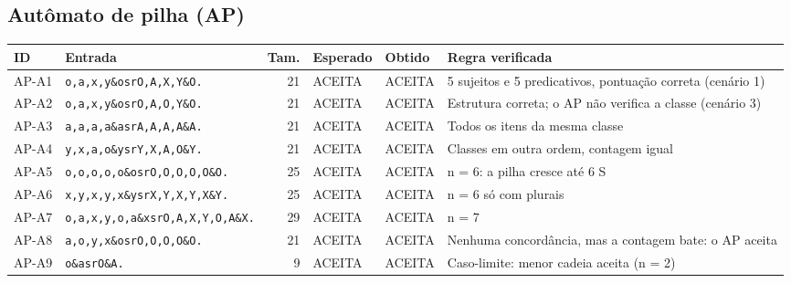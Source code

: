 \subsection*{Autômato de pilha (AP)}
{\footnotesize\setlength{\tabcolsep}{3pt}\begin{longtable}{l p{4cm} r p{2cm} p{2cm} p{3.8cm}}
\textbf{ID} & \textbf{Entrada} & \textbf{Tam.} & \textbf{Esperado} & \textbf{Obtido} & \textbf{Regra verificada} \\ \hline \endhead
AP-A1 & \texttt{o,\allowbreak{}a,\allowbreak{}x,\allowbreak{}y\&osrO,\allowbreak{}A,\allowbreak{}X,\allowbreak{}Y\&O.} & 21 & ACEITA & ACEITA & 5 sujeitos e 5 predicativos, pontuação correta (cenário 1) \\
AP-A2 & \texttt{o,\allowbreak{}a,\allowbreak{}x,\allowbreak{}y\&osrO,\allowbreak{}A,\allowbreak{}O,\allowbreak{}Y\&O.} & 21 & ACEITA & ACEITA & Estrutura correta; o AP não verifica a classe (cenário 3) \\
AP-A3 & \texttt{a,\allowbreak{}a,\allowbreak{}a,\allowbreak{}a\&asrA,\allowbreak{}A,\allowbreak{}A,\allowbreak{}A\&A.} & 21 & ACEITA & ACEITA & Todos os itens da mesma classe \\
AP-A4 & \texttt{y,\allowbreak{}x,\allowbreak{}a,\allowbreak{}o\&ysrY,\allowbreak{}X,\allowbreak{}A,\allowbreak{}O\&Y.} & 21 & ACEITA & ACEITA & Classes em outra ordem, contagem igual \\
AP-A5 & \texttt{o,\allowbreak{}o,\allowbreak{}o,\allowbreak{}o,\allowbreak{}o\&osrO,\allowbreak{}O,\allowbreak{}O,\allowbreak{}O,\allowbreak{}O\&O.} & 25 & ACEITA & ACEITA & n = 6: a pilha cresce até 6 S \\
AP-A6 & \texttt{x,\allowbreak{}y,\allowbreak{}x,\allowbreak{}y,\allowbreak{}x\&ysrX,\allowbreak{}Y,\allowbreak{}X,\allowbreak{}Y,\allowbreak{}X\&Y.} & 25 & ACEITA & ACEITA & n = 6 só com plurais \\
AP-A7 & \texttt{o,\allowbreak{}a,\allowbreak{}x,\allowbreak{}y,\allowbreak{}o,\allowbreak{}a\&xsrO,\allowbreak{}A,\allowbreak{}X,\allowbreak{}Y,\allowbreak{}O,\allowbreak{}A\&X.} & 29 & ACEITA & ACEITA & n = 7 \\
AP-A8 & \texttt{a,\allowbreak{}o,\allowbreak{}y,\allowbreak{}x\&osrO,\allowbreak{}O,\allowbreak{}O,\allowbreak{}O\&O.} & 21 & ACEITA & ACEITA & Nenhuma concordância, mas a contagem bate: o AP aceita \\
AP-A9 & \texttt{o\&asrO\&A.} & 9 & ACEITA & ACEITA & Caso-limite: menor cadeia aceita (n = 2) \\

\end{longtable}}
